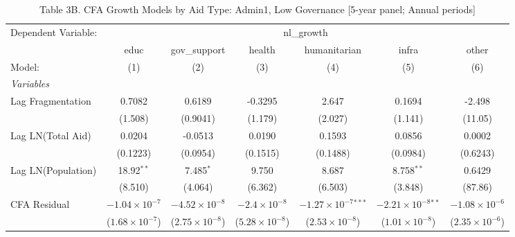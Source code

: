 
\begin{table}[H]
   \caption{Table 3B. CFA Growth Models by Aid Type: Admin1, Low Governance [5-year panel; Annual periods]}
   \centering
   \begin{tabular}{lcccccc}
      \tabularnewline \midrule \midrule
      Dependent Variable: & \multicolumn{6}{c}{nl\_growth}\\
                         & educ                    & gov\_support            & health                  & humanitarian                   & infra                         & other \\   
      Model:             & (1)                     & (2)                     & (3)                     & (4)                            & (5)                           & (6)\\  
      \midrule
      \emph{Variables}\\
      Lag Fragmentation  & 0.7082                  & 0.6189                  & -0.3295                 & 2.647                          & 0.1694                        & -2.498\\   
                         & (1.508)                 & (0.9041)                & (1.179)                 & (2.027)                        & (1.141)                       & (11.05)\\   
      Lag LN(Total Aid)  & 0.0204                  & -0.0513                 & 0.0190                  & 0.1593                         & 0.0856                        & 0.0002\\   
                         & (0.1223)                & (0.0954)                & (0.1515)                & (0.1488)                       & (0.0984)                      & (0.6243)\\   
      Lag LN(Population) & 18.92$^{**}$            & 7.485$^{*}$             & 9.750                   & 8.687                          & 8.758$^{**}$                  & 0.6429\\   
                         & (8.510)                 & (4.064)                 & (6.362)                 & (6.503)                        & (3.848)                       & (87.86)\\   
      CFA Residual       & $-1.04\times 10^{-7}$   & $-4.52\times 10^{-8}$   & $-2.4\times 10^{-8}$    & $-1.27\times 10^{-7}$$^{***}$  & $-2.21\times 10^{-8}$$^{**}$  & $-1.08\times 10^{-6}$\\    
                         & ($1.68\times 10^{-7}$)  & ($2.75\times 10^{-8}$)  & ($5.28\times 10^{-8}$)  & ($2.53\times 10^{-8}$)         & ($1.01\times 10^{-8}$)        & ($2.35\times 10^{-6}$)\\    

\end{tabular}
\end{table}
